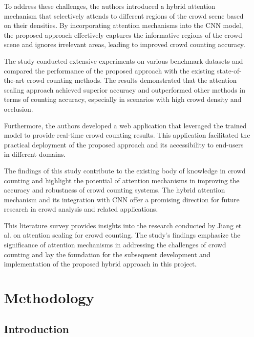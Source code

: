 \documentclass[12pt]{report}
\begin{document}
To address these challenges, the authors introduced a hybrid attention mechanism that selectively attends to different regions of the crowd scene based on their densities. By incorporating attention mechanisms into the CNN model, the proposed approach effectively captures the informative regions of the crowd scene and ignores irrelevant areas, leading to improved crowd counting accuracy.
\newline

The study conducted extensive experiments on various benchmark datasets and compared the performance of the proposed approach with the existing state-of-the-art crowd counting methods. The results demonstrated that the attention scaling approach achieved superior accuracy and outperformed other methods in terms of counting accuracy, especially in scenarios with high crowd density and occlusion.
\newline

Furthermore, the authors developed a web application that leveraged the trained model to provide real-time crowd counting results. This application facilitated the practical deployment of the proposed approach and its accessibility to end-users in different domains.
\newline

The findings of this study contribute to the existing body of knowledge in crowd counting and highlight the potential of attention mechanisms in improving the accuracy and robustness of crowd counting systems. The hybrid attention mechanism and its integration with CNN offer a promising direction for future research in crowd analysis and related applications.
\newline

This literature survey provides insights into the research conducted by Jiang et al. on attention scaling for crowd counting. The study's findings emphasize the significance of attention mechanisms in addressing the challenges of crowd counting and lay the foundation for the subsequent development and implementation of the proposed hybrid approach in this project.
\newline




\chapter{Methodology}

\section{Introduction}
\end{document}
